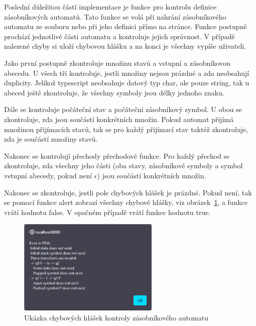 Poslední důležitou částí implementace je funkce pro kontrolu definice zásobníkových automatů. Tato funkce se volá při nahrání zásobníkového automatu ze souboru nebo při jeho definici přímo na stránce. Funkce postupně prochází jednotlivé části automatu a kontroluje jejich správnost. V případě nalezené chyby si uloží chybovou hlášku a na konci je všechny vypíše uživateli.

Jako první postupně zkontroluje množinu stavů a vstupní a zásobníkovou abecedu. U všech tří kontroluje, jestli množiny nejsou prázdné a zda neobsahují duplicity. Jelikož typescript neobsahuje datový typ char, ale pouze string, tak u abeced ještě zkontroluje, že všechny symboly jsou délky jednoho znaku.

Dále se kontroluje počáteční stav a počáteční zásobníkový symbol. U obou se zkontroluje, zda jsou součástí konkrétních množin. Pokud automat přijímá množinou přijímacích stavů, tak se pro každý přijímací stav taktéž zkontroluje, zda je součástí množiny stavů. 

Nakonec se kontrolují přechody přechodové funkce. Pro každý přechod se zkontroluje, zda všechny jeho části (oba stavy, zásobníkové symboly a symbol vstupní abecedy, pokud není $\epsilon$) jsou součástí konkrétních množin.

Nakonec se zkontroluje, jestli pole chybových hlášek je prázdné. Pokud není, tak se pomocí funkce alert zobrazí všechny chybové hlášky, viz obrázek~\ref{fig:PDACheckErrors}, a funkce vrátí hodnotu false. V opačném případě vrátí funkce hodnotu true.

\begin{figure}[h]
    \centering
    \includegraphics[width=0.6\textwidth]{Figures/PrntScrn_PDACheckErrors.png}
    \caption{Ukázka chybových hlášek kontroly zásobníkového automatu}\label{fig:PDACheckErrors}
\end{figure}

\endinput